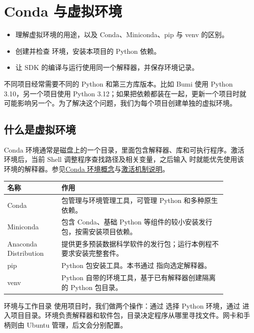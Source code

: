 \chapter{Conda 与虚拟环境}
\label{chap:conda}
\begin{intro}
\begin{itemize}
\item 理解虚拟环境的用途，以及 Conda、Miniconda、pip 与 venv 的区别。
\item 创建并检查  环境，安装本项目的 Python 依赖。
\item 让 SDK 的编译与运行使用同一个解释器，并保存环境记录。
\end{itemize}
\end{intro}

不同项目经常需要不同的 Python 和第三方库版本。比如 Bumi 使用 Python 3.10，另一个项目使用 Python 3.12；如果把依赖都装在一起，更新一个项目时就可能影响另一个。为了解决这个问题，我们为每个项目创建单独的虚拟环境。

\section{什么是虚拟环境}
Conda 环境通常是磁盘上的一个目录，里面包含解释器、库和可执行程序。激活环境后，当前 Shell 调整程序查找路径及相关变量，之后输入  时就能优先使用该环境的解释器。参见\href{https://docs.conda.io/projects/conda/en/stable/user-guide/concepts/environments.html}{Conda 环境概念}与\href{https://docs.conda.io/projects/conda/en/stable/dev-guide/deep-dives/activation.html}{激活机制说明}。

\begin{longtable}{@{}P{0.22\linewidth}P{0.67\linewidth}@{}}
\toprule
\textbf{名称} & \textbf{作用} \\
\midrule
Conda & 包管理与环境管理工具，可管理 Python 和多种原生依赖。\\
Miniconda & 包含 Conda、基础 Python 等组件的较小安装发行包，按需安装项目依赖。\\
Anaconda Distribution & 提供更多预装数据科学软件的发行包；运行本例程不要求安装完整套件。\\
pip & Python 包安装工具。本书通过  指向选定解释器。\\
venv & Python 自带的环境工具，基于已有解释器创建隔离的 Python 包目录。\\
\bottomrule
\end{longtable}

\begin{remark}{环境与工作目录}
使用项目时，我们做两个操作：通过  选择 Python 环境，通过  进入项目目录。环境负责解释器和软件包，目录决定程序从哪里寻找文件。网卡和手柄则由 Ubuntu 管理，后文会分别配置。
\end{remark}

